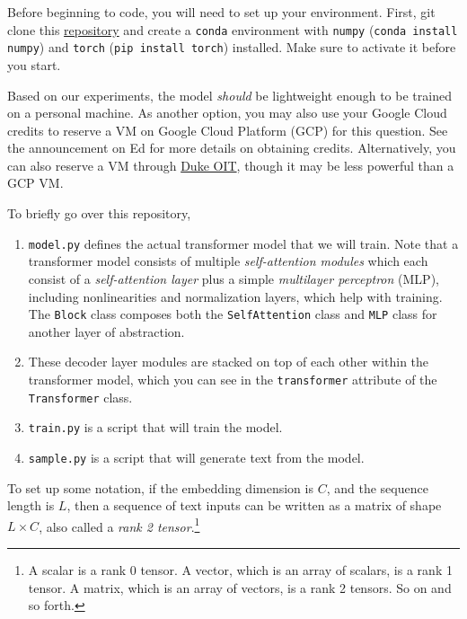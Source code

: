 \documentclass{exam}
\begin{document}
Before beginning to code, you will need to set up your environment. First, git clone this \href{https://github.com/mbahng/mini_transformer}{repository} and create a \texttt{conda} environment with \texttt{numpy} (\texttt{conda install numpy}) and \texttt{torch} (\texttt{pip install torch}) installed. Make sure to activate it before you start. 

Based on our experiments, the model \emph{should} be lightweight enough to be trained on a personal machine. As another option, you may also use your Google Cloud credits to reserve a VM on Google Cloud Platform (GCP) for this question. See the announcement on Ed for more details on obtaining credits. Alternatively, you can also reserve a VM through \href{https://vcm.duke.edu/apps/index}{Duke OIT}, though it may be less powerful than a GCP VM. 

To briefly go over this repository, 
\begin{enumerate}
    \item \texttt{model.py} defines the actual transformer model that we will train. Note that a transformer model consists of multiple \textit{self-attention modules} which each consist of a \textit{self-attention layer} plus a simple \textit{multilayer perceptron} (MLP), including nonlinearities and normalization layers, which help with training. The \texttt{Block} class composes both the \texttt{SelfAttention} class and \texttt{MLP} class for another layer of abstraction. 
    \item These decoder layer modules are stacked on top of each other within the transformer model, which you can see in the \texttt{transformer} attribute of the \texttt{Transformer} class. 
    \item \texttt{train.py} is a script that will train the model. 
    \item \texttt{sample.py} is a script that will generate text from the model. 
\end{enumerate}

To set up some notation, if the embedding dimension is $C$, and the sequence length is $L$, then a sequence of text inputs can be written as a matrix of shape $L \times C$, also called a \textit{rank 2 tensor}.\footnote{A scalar is a rank 0 tensor. A vector, which is an array of scalars, is a rank 1 tensor. A matrix, which is an array of vectors, is a rank 2 tensors. So on and so forth.} 
\end{document}

